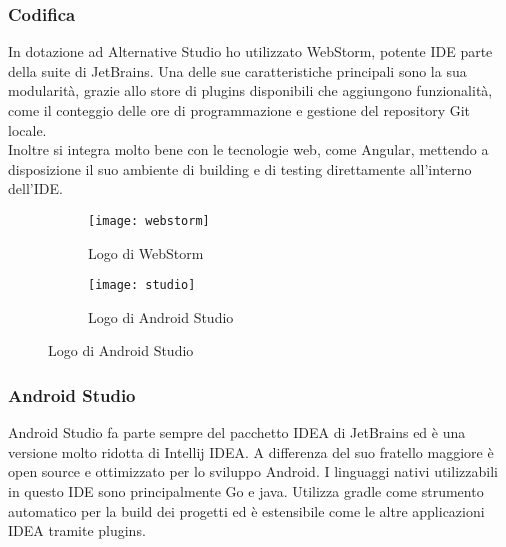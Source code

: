 \subsubsection{Codifica}
In dotazione ad Alternative Studio ho utilizzato WebStorm, potente IDE parte della suite di JetBrains. Una delle sue caratteristiche principali sono la sua modularità, grazie allo store di plugins disponibili che aggiungono funzionalità, come il conteggio delle ore di programmazione e gestione del repository \gls{Git} locale. \\
Inoltre si integra molto bene con le tecnologie web, come Angular, mettendo a disposizione il suo ambiente di building e di testing direttamente all'interno dell'IDE.

\begin{figure}[htbp]
	\begin{subfigure}{0.5\textwidth}
		\texttt{[image: webstorm]}
		\caption{Logo di WebStorm}
	\end{subfigure}
	\begin{subfigure}{0.5\textwidth}
		\texttt{[image: studio]}
		\caption{Logo di Android Studio}
	\end{subfigure}
\end{figure}

\subsubsection{Android Studio}
Android Studio fa parte sempre del pacchetto IDEA di JetBrains ed è una versione molto ridotta di Intellij IDEA. A differenza del suo fratello maggiore è open source e ottimizzato per lo sviluppo Android. I linguaggi nativi utilizzabili in questo IDE sono principalmente \gls{Go} e \gls{java}. Utilizza gradle come strumento automatico per la build dei progetti ed è estensibile come le altre applicazioni IDEA tramite plugins.

